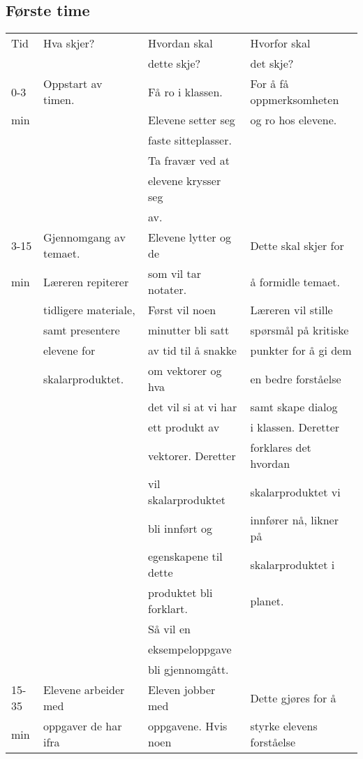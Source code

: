 \documentclass{article}
\begin{document}
\subsection*{Første time}
\label{sec-2-1}
\begin{center}
\begin{tabular}{l|l|l|l}
Tid & Hva skjer? & Hvordan skal & Hvorfor skal\\
 &  & dette skje? & det skje?\\
\hline
0-3 & Oppstart av timen. & Få ro i klassen. & For å få oppmerksomheten\\
min &  & Elevene setter seg & og ro hos elevene.\\
 &  & faste sitteplasser. & \\
 &  & Ta fravær ved at & \\
 &  & elevene krysser seg & \\
 &  & av. & \\
\hline
3-15 & Gjennomgang av temaet. & Elevene lytter og de & Dette skal skjer for\\
min & Læreren repiterer & som vil tar notater. & å formidle temaet.\\
 & tidligere materiale, & Først vil noen & Læreren vil stille\\
 & samt presentere & minutter bli satt & spørsmål på kritiske\\
 & elevene for & av tid til å snakke & punkter for å gi dem\\
 & skalarproduktet. & om vektorer og hva & en bedre forståelse\\
 &  & det vil si at vi har & samt skape dialog\\
 &  & ett produkt av & i klassen. Deretter\\
 &  & vektorer. Deretter & forklares det hvordan\\
 &  & vil skalarproduktet & skalarproduktet vi\\
 &  & bli innført og & innfører nå, likner på\\
 &  & egenskapene til dette & skalarproduktet i\\
 &  & produktet bli forklart. & planet.\\
 &  & Så vil en & \\
 &  & eksempeloppgave & \\
 &  & bli gjennomgått. & \\
\hline
15-35 & Elevene arbeider med & Eleven jobber med & Dette gjøres for å\\
min & oppgaver de har ifra & oppgavene. Hvis noen & styrke elevens forståelse\\

\end{tabular}
\end{center}
\end{document}
